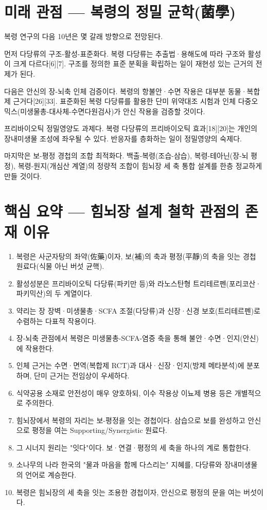 \documentclass[12pt,oneside]{book}
\begin{document}
\section{미래 관점 — 복령의 정밀 균학(菌學)}

복령 연구의 다음 10년은 몇 갈래 방향으로 전망된다.

먼저 다당류의 구조-활성-표준화다. 복령 다당류는 추출법·용해도에 따라 구조와 활성이 크게 다르다[6][7]. 구조를 정의한 표준 분획을 확립하는 일이 재현성 있는 근거의 전제가 된다.

다음은 안신의 장-뇌축 인체 검증이다. 복령의 항불안·수면 작용은 대부분 동물·복합제 근거다[26][33]. 표준화된 복령 다당류를 활용한 단미 위약대조 시험과 인체 다중오믹스(미생물총-대사체-수면다원검사)가 안신 작용을 검증할 것이다.

프리바이오틱 정밀영양도 과제다. 복령 다당류의 프리바이오틱 효과[18][20]는 개인의 장내미생물 조성에 좌우될 수 있다. 반응자를 층화하는 일이 정밀영양의 숙제다.

마지막은 보-평정 경첩의 조합 최적화다. 백출-복령(조습-삼습), 복령-테아닌(장-뇌 평정), 복령-원지(개심산 계열)의 정량적 조합이 힘뇌장 세 축 통합 설계를 한층 정교하게 만들 것이다.

\section{핵심 요약 — 힘뇌장 설계 철학 관점의 존재 이유}

\begin{enumerate}[leftmargin=6mm,itemsep=1pt,topsep=2pt]
  \item 복령은 사군자탕의 좌약(佐藥)이자, 보(補)의 축과 평정(平靜)의 축을 잇는 경첩 원료다(식물 아닌 버섯 균핵).
  \item 활성성분은 프리바이오틱 다당류(파키만 등)와 라노스탄형 트리테르펜(포리코산·파키믹산)의 두 계열이다.
  \item 약리는 장 장벽·미생물총·SCFA 조절(다당류)과 신장·신경 보호(트리테르펜)로 수렴하는 다표적 작용이다.
  \item 장-뇌축 관점에서 복령은 미생물총-SCFA-염증 축을 통해 불안·수면·인지(안신)에 작용한다.
  \item 인체 근거는 수면·면역(복합제 RCT)과 대사·신장·인지(방제 메타분석)에 분포하며, 단미 근거는 전임상이 우세하다.
  \item 식약공용 소재로 안전성이 매우 양호하되, 이수 작용상 이뇨제 병용 등은 개별적으로 주의한다.
  \item 힘뇌장에서 복령의 자리는 보-평정을 잇는 경첩이다. 삼습으로 보를 완성하고 안신으로 평정을 여는 Supporting/Synergistic 원료다.
  \item 그 시너지 원리는 "잇다"이다. 보·연결·평정의 세 축을 하나의 계로 통합한다.
  \item 소나무의 나라 한국의 "물과 마음을 함께 다스리는" 지혜를, 다당류와 장내미생물의 언어로 계승한다.
  \item 복령은 힘뇌장의 세 축을 잇는 조용한 경첩이자, 안신으로 평정의 문을 여는 버섯이다.
\end{enumerate}
\end{document}

